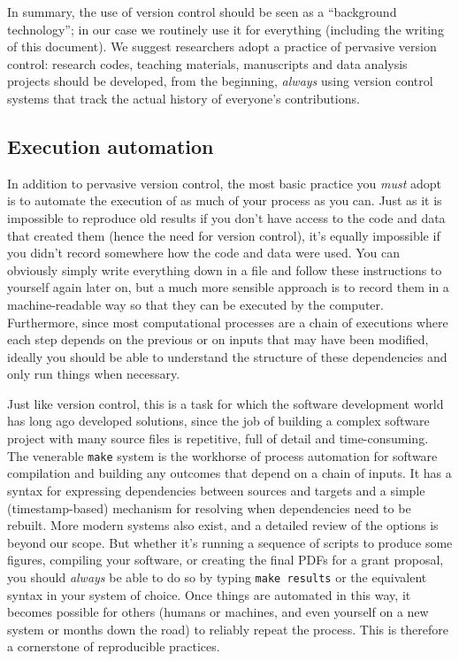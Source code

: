 \documentclass[ChapterTOCs,krantz2]{krantz} %
\begin{document}
In summary, the use of version control should be seen as a ``background
technology''; in our case we routinely use it for everything (including the
writing of this document).  We suggest researchers adopt a practice of
pervasive version control: research codes, teaching materials, manuscripts and
data analysis projects should be developed, from the beginning, \emph{always}
using version control systems that track the actual history of everyone's
contributions.

\subsection{Execution automation}

In addition to pervasive version control, the most basic practice you
\emph{must} adopt is to automate the execution of as much of your process as
you can.  Just as it is impossible to reproduce old results if you don't have
access to the code and data that created them (hence the need for version
control), it's equally impossible if you didn't record somewhere how the code
and data were used.  You can obviously simply write everything down in a file
and follow these instructions to yourself again later on, but a much more
sensible approach is to record them in a machine-readable way so that they can
be executed by the computer.  Furthermore, since most computational processes
are a chain of executions where each step depends on the previous or on inputs
that may have been modified, ideally you should be able to understand the
structure of these dependencies and only run things when necessary.

Just like version control, this is a task for which the software development
world has long ago developed solutions, since the job of building a complex
software project with many source files is repetitive, full of detail and
time-consuming.  The venerable \texttt{make} system is the workhorse of process
automation for software compilation and building any outcomes that depend on a
chain of inputs.  It has a syntax for expressing dependencies between sources
and targets and a simple (timestamp-based) mechanism for resolving when
dependencies need to be rebuilt.  More modern systems also exist, and a
detailed review of the options is beyond our scope.  But whether it's running a
sequence of scripts to produce some figures, compiling your software, or
creating the final PDFs for a grant proposal, you should \emph{always} be able
to do so by typing \texttt{make results} or the equivalent syntax in your
system of choice.  Once things are automated in this way, it becomes possible
for others (humans or machines, and even yourself on a new system or months
down the road) to reliably repeat the process.  This is therefore a cornerstone
of reproducible practices.
\end{document}
